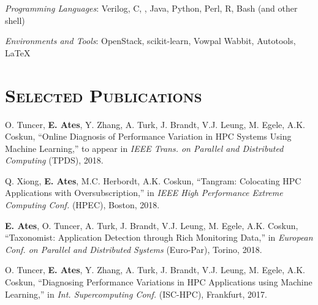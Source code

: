 \begin{resume}
	\emph{Programming Languages}: Verilog, C, \Cplusplus, Java, Python, Perl, R,
  Bash (and other shell)
	\setlength{\parskip}{1mm}

	\emph{Environments and Tools}: OpenStack, scikit-learn, Vowpal Wabbit, Autotools, \LaTeX




  \section{\textsc{Selected Publications}}
  O. Tuncer, \textbf{E. Ates}, Y. Zhang, A. Turk, J. Brandt, V.J. Leung, M.
  Egele, A.K. Coskun, ``Online Diagnosis of Performance Variation in HPC Systems
  Using Machine Learning,'' to appear in \textit{IEEE Trans. on Parallel and
    Distributed Computing} (TPDS), 2018.

  \vspace{0.1in}

  Q. Xiong, \textbf{E. Ates}, M.C. Herbordt, A.K. Coskun, ``Tangram: Colocating
  HPC Applications with Oversubscription,'' in \textit{IEEE High Performance
    Extreme Computing Conf.} (HPEC), Boston, 2018.

  \vspace{0.1in}
  
  \textbf{E. Ates}, O. Tuncer, A. Turk, J. Brandt, V.J. Leung, M. Egele, A.K.
  Coskun, ``Taxonomist: Application Detection through Rich Monitoring Data,'' in
  \textit{European Conf. on Parallel and Distributed Systems} (Euro-Par),
  Torino, 2018. 

  \vspace{0.1in}
  
  O. Tuncer, \textbf{E. Ates}, Y. Zhang, A. Turk, J. Brandt, V.J. Leung, M.
  Egele, A.K. Coskun, ``Diagnosing Performance Variations in HPC Applications
  using Machine Learning,'' in \textit{Int. Supercomputing Conf.} (ISC-HPC),
  Frankfurt, 2017.




\end{resume}
